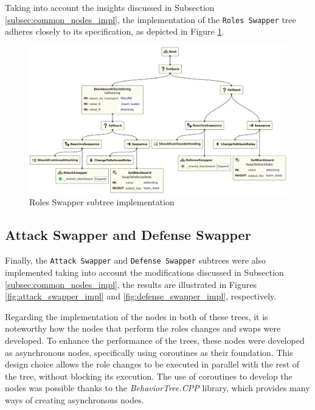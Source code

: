 Taking into account the insights discussed in Subsection \ref{subsec:common_nodes_impl}, the implementation of the \texttt{Roles Swapper} tree adheres closely to its specification, as depicted in Figure \ref{fig:roles_swapper_impl}.

\begin{figure}[!h]
    \centering
    \includegraphics[width=1.0\linewidth]{chapters/development/images/RolesSwapper.png}
    \caption{Roles Swapper subtree implementation}
    \label{fig:roles_swapper_impl}
\end{figure}

\subsection{Attack Swapper and Defense Swapper}

Finally, the \texttt{Attack Swapper} and \texttt{Defense Swapper} subtrees were also implemented taking into account the modifications discussed in Subsection \ref{subsec:common_nodes_impl}, the results are illustrated in Figures \ref{fig:attack_swapper_impl} and \ref{fig:defense_swapper_impl}, respectively.

Regarding the implementation of the nodes in both of these trees, it is noteworthy how the nodes that perform the roles changes and swaps were developed. To enhance the performance of the trees, these nodes were developed as asynchronous nodes, specifically using coroutines as their foundation. This design choice allows the role changes to be executed in parallel with the rest of the tree, without blocking its execution. The use of coroutines to develop the nodes was possible thanks to the \textit{BehaviorTree.CPP} library, which provides many ways of creating asynchronous nodes.

